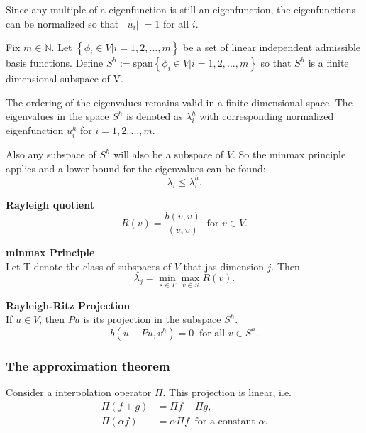 \documentclass[../../main.tex]{subfiles}
\begin{document}
Since any multiple of a eigenfunction is still an eigenfunction, the eigenfunctions can be normalized so that $||u_i|| = 1$ for all $i$.

Fix $m \in \mathbb{N}$. Let $\left\{ \phi_i \in V | i = 1,2,...,m \right\}$ be a set of linear independent admissible basis functions. Define $S^h := \text{span}\left\{\phi_i \in V | i = 1,2,...,m\right\}$ so that $S^h$ is a finite dimensional subspace of V. \label{sym:natural} \label{sym:Sh1}

The ordering of the eigenvalues remains valid in a finite dimensional space. The eigenvalues in the space $S^h$ is denoted as $\lambda_i^h$ with corresponding normalized eigenfunction $u^h_i$ for $i = 1,2,...,m$.

Also any subspace of $S^h$ will also be a subspace of $V$. So the minmax principle applies and a lower bound for the eigenvalues can be found:
\begin{equation}
	\lambda_i \leq \lambda_i^h.
\end{equation}

\textbf{Rayleigh quotient}
\begin{equation*}
	R(v) = \frac{b(v,v)}{(v,v)} \ \text { for } v \in V.
\end{equation*} \label{sym:Rayleigh}

\textbf{minmax Principle}\\
Let T denote the class of subspaces of $V$ that jas dimension $j$. Then
\begin{equation*}
	\lambda_j = \min_{s\in T}\max_{v \in S} R(v).
\end{equation*}

\textbf{Rayleigh-Ritz Projection}\\
If $u \in V$, then $Pu$ is its projection in the subspace $S^h$.
\begin{equation*}
	b(u-Pu,v^h) = 0 \ \text{ for all } v \in S^h.
\end{equation*}

\subsubsection{The approximation theorem}

Consider a interpolation operator $\Pi$.\label{sym:interpolation} This projection is linear, i.e.
\begin{align*}
	\Pi(f + g) & = \Pi f + \Pi g,\\
	\Pi(\alpha f) & = \alpha \Pi f \ \text{ for a constant } \alpha. 
\end{align*}
\end{document}
